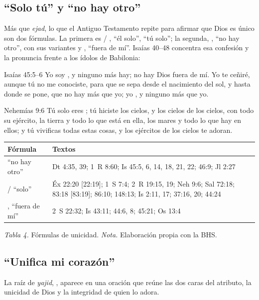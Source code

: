 \subsection{“Solo tú” y “no hay otro”}
Más que \emph{ejad}, lo que el Antiguo Testamento repite para afirmar que Dios es único son dos fórmulas. La primera es  / , ``él solo'', ``tú solo''; la segunda, , ``no hay otro'', con sus variantes  y , ``fuera de mí''. Isaías 40--48 concentra esa confesión y la pronuncia frente a los ídolos de Babilonia:

\begin{verso}{Isaías 45:5–6}
Yo soy \SENOR, y ninguno más hay; no hay Dios fuera de mí. Yo te ceñiré, aunque tú no me conociste, para que se sepa desde el nacimiento del sol, y hasta donde se pone, que no hay más que yo; yo \SENOR, y ninguno más que yo.
\end{verso}
\begin{verso}{Nehemías 9:6}
Tú solo eres \SENOR; tú hiciste los cielos, y los cielos de los cielos, con todo su ejército, la tierra y todo lo que está en ella, los mares y todo lo que hay en ellos; y tú vivificas todas estas cosas, y los ejércitos de los cielos te adoran.
\end{verso}

\begin{center}\small\renewcommand{\arraystretch}{1.25}
\begin{tabular}{@{}L{3.6cm}L{10.8cm}@{}}
\toprule
\textbf{Fórmula} & \textbf{Textos} \\ \midrule
{} ``no hay otro'' & Dt 4:35, 39; 1~R 8:60; Is 45:5, 6, 14, 18, 21, 22; 46:9; Jl 2:27 \\
 /  ``solo'' & Éx 22:20 [22:19]; 1~S 7:4; 2~R 19:15, 19; Neh 9:6; Sal 72:18; 83:18 [83:19]; 86:10; 148:13; Is 2:11, 17; 37:16, 20; 44:24 \\
,  ``fuera de mí'' & 2~S 22:32; Is 43:11; 44:6, 8; 45:21; Os 13:4 \\
\bottomrule
\end{tabular}\par
{\footnotesize\color{gris}\textit{Tabla 4.} Fórmulas de unicidad. \textit{Nota.} Elaboración propia con la BHS.}
\end{center}

\subsection{“Unifica mi corazón”}
La raíz de \emph{yajid}, , aparece en una oración que reúne las dos caras del atributo, la unicidad de Dios y la integridad de quien lo adora.

